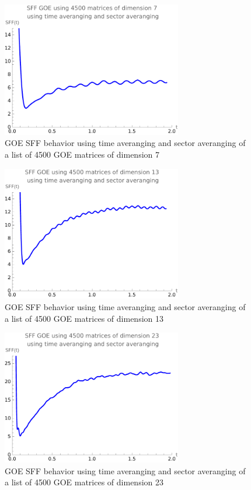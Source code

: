 \documentclass[10pt,a4paper]{article}
\begin{document}
\begin{figure}[H]
    \centering
    \includegraphics[width=0.7\textwidth]{SFFGOETS7.pdf}
    \caption{GOE SFF behavior using time averanging and sector averanging of a list of 4500 GOE matrices of dimension 7}
    \label{fig:SFFGOETS7}
\end{figure}

\begin{figure}[H]
    \centering
    \includegraphics[width=0.7\textwidth]{SFFGOETS13.pdf}
    \caption{GOE SFF behavior using time averanging and sector averanging of a list of 4500 GOE matrices of dimension 13}
    \label{fig:SFFGOETS13}
\end{figure}

\begin{figure}[H]
    \centering
    \includegraphics[width=0.7\textwidth]{SFFGOETS.pdf}
    \caption{GOE SFF behavior using time averanging and sector averanging of a list of 4500 GOE matrices of dimension 23}
    \label{fig:SFFGOETS23}
\end{figure}
\end{document}
